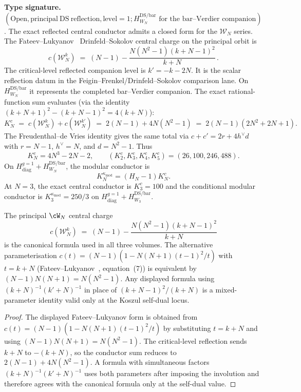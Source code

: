 \begin{remark}\label{rem:koszul-conductor-explicit}
\textbf{Type signature.}
$(\mathrm{Open},\mathrm{principal\ DS\ reflection},\mathrm{level}=1;
H_{W_N}^{\mathrm{DS/bar}}\text{ for the bar--Verdier companion})$.
The exact reflected central conductor admits a closed form for the
$\mathcal{W}_N$ series.  The Fateev--Lukyanov~\cite{FateevLukyanov88}
Drinfeld--Sokolov central charge on the principal orbit is
\[
c(\mathcal{W}_N^k) \;=\; (N-1) - \frac{N(N^2-1)(k+N-1)^2}{k+N}\,.
\]
The critical-level reflected companion level is
\(k'=-k-2N\).  It is the scalar reflection datum in the
Feigin--Frenkel/Drinfeld--Sokolov comparison lane.  On
$H_{W_N}^{\mathrm{DS/bar}}$ it represents the completed bar--Verdier
companion.  The exact rational-function sum evaluates (via the
identity \((k+N+1)^2-(k+N-1)^2=4(k+N)\)):
\[
K_N^c \;=\; c(\mathcal{W}_N^k) + c(\mathcal{W}_N^{k'})
\;=\; 2(N-1) + 4N(N^2-1)
\;=\; 2(N-1)(2N^2 + 2N + 1).
\]
The Freudenthal--de Vries identity gives the same total via
$c+c'=2r+4h^\vee d$ with $r=N-1$, $h^\vee=N$, and $d=N^2-1$.
Thus
\[
K_N^c=4N^3-2N-2,\qquad
(K_2^c,K_3^c,K_4^c,K_5^c)=(26,100,246,488).
\]
On $H_{\mathrm{diag}}^{g=1}+H_{W_N}^{\mathrm{DS/bar}}$, the modular
conductor is
\[
K_N^{\kappa_{\mathrm{mod}}}=(H_N-1)K_N^c.
\]
At $N=3$, the exact central conductor is $K_3^c=100$ and the
conditional modular conductor is
$K_3^{\kappa_{\mathrm{mod}}}=250/3$ on
$H_{\mathrm{diag}}^{g=1}+H_{W_3}^{\mathrm{DS/bar}}$.
\end{remark}

\begin{proposition}
\label{prop:fateev-lukyanov-canonical}
The principal $\cW_N$ central charge
\begin{equation}\label{eq:fateev-lukyanov-wn}
c(\mathcal{W}_N^k) \;=\; (N-1) - \frac{N(N^2-1)(k+N-1)^2}{k+N}
\end{equation}
is the canonical formula used in all three volumes. The alternative
parameterisation
$c(t)=(N-1)(1-N(N+1)(t-1)^2/t)$ with $t=k+N$
(Fateev--Lukyanov~\cite{FateevLukyanov88}, equation~(7)) is equivalent
by $(N-1)N(N+1)=N(N^2-1)$. Any displayed formula using
$(k+N)^{-1}(k'+N)^{-1}$ in place of $(k+N-1)^2/(k+N)$ is a
mixed-parameter identity valid only at the Koszul self-dual locus.
\end{proposition}

\begin{proof}
The displayed Fateev--Lukyanov form is obtained from
$c(t)=(N-1)(1-N(N+1)(t-1)^2/t)$ by substituting $t=k+N$ and using
$(N-1)N(N+1)=N(N^2-1)$. The critical-level reflection sends
$k+N$ to $-(k+N)$, so the conductor sum reduces to
$2(N-1)+4N(N^2-1)$. A formula with simultaneous factors
$(k+N)^{-1}(k'+N)^{-1}$ uses both parameters after imposing the
involution and therefore agrees with the canonical formula only at
the self-dual value.
\end{proof}

